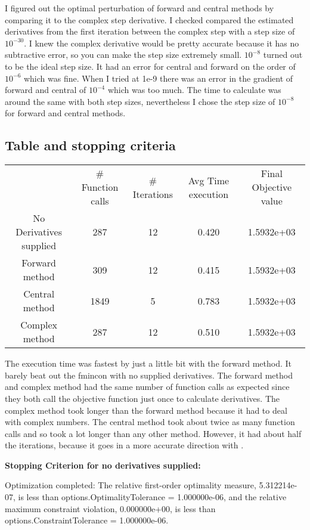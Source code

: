 \documentclass[a4paper]{article}
\begin{document}
    I figured out the optimal perturbation of forward and central methods by comparing it to the complex step derivative.
    I checked compared the estimated derivatives from the first iteration between the complex step with a step size of $10^{-30}$. 
    I knew the complex derivative would be pretty accurate because it has no subtractive error, so you can make the step size extremely small. 
    $10^{-8}$ turned out to be the ideal step size. It had an error for central and forward on the order of $10^{-6}$ which was fine.
    When I tried at 1e-9 there was an error in the gradient of forward and central of $10^{-4}$ which was too much. 
    The time to calculate was around the same with both step sizes, nevertheless I chose the step size of $10^{-8}$ for forward and central methods.
    
    \subsection{Table and stopping criteria}
    \begin{center}
    \begin{tabular}[h]{c c c c c}
        & \# Function calls & \# Iterations & Avg Time execution& Final Objective value \\
        No Derivatives supplied&287&12&0.420 &1.5932e+03\\
        Forward method&309&12&0.415 & 1.5932e+03\\
        Central method&1849&5&0.783 & 1.5932e+03\\ 
        Complex method&287&12&0.510  &   1.5932e+03 
    \end{tabular}
\end{center}

The execution time was fastest by just a little bit with the forward method. It barely beat out the fmincon with no supplied derivatives.
The forward method and complex method had the same number of function calls as expected since they both call the objective function just once to calculate derivatives. 
The complex method took longer than the forward method because it had to deal with complex numbers. 
The central method took about twice as many function calls and so took a lot longer than any other method. 
However, it had about half the iterations, because it goes in a more accurate direction with .

\textbf{Stopping Criterion for no derivatives supplied: }

Optimization completed: The relative first-order optimality measure, 5.312214e-07, is less than options.OptimalityTolerance = 1.000000e-06, and the relative maximum constraint violation, 0.000000e+00, is less than options.ConstraintTolerance = 1.000000e-06.
\end{document}
